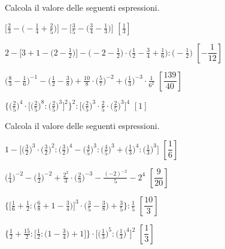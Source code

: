 \begin{esercizio}[\Ast]
\label{ese:3.148}
 Calcola il valore delle seguenti espressioni.
\begin{enumeratea}
\spazielenx
\item $\displaystyle{\bigg[\frac{2}{3}-\bigg(-\frac{1}{4}+\frac{2}{5}\bigg)
\bigg]-\bigg[\frac{3}{5}-%
\bigg(\frac{3}{4}-\frac{1}{3}\bigg)\bigg]}$
  \hfill \(\left[\frac{1}{3} \right]\)
\item $\displaystyle{2-\bigg[3+1-\bigg(2-\frac{1}{2}\bigg)\bigg]-
\bigg(-2-\frac{1}{2}\bigg)\cdot%
\bigg(\frac{1}{2}-\frac{3}{4}+\frac{1}{6}\bigg):\bigg(-{\frac{1}{2}}\bigg)}$
  \hfill \(\left[-\dfrac{1}{12} \right]\)
\item $\displaystyle{\bigg(\frac{8}{3}-\frac{1}{6}\bigg)^{-1}-
\bigg(\frac{1}{2}-\frac{3}{8}\bigg)+\frac{10}{8}\cdot%
\bigg(\frac{5}{7}\bigg)^{-2}+\bigg(\frac{1}{3}\bigg)^{-3}\cdot
\frac{1}{6^{2}}}$
  \hfill \(\left[\dfrac{139}{40} \right]\)
\item $\displaystyle{\bigg\{\bigg(\frac{2}{5}\bigg)^{4}\cdot
\bigg[\bigg(\frac{2}{5}\bigg)^{8}:%
\bigg(\frac{2}{5}\bigg)^{3}\bigg]^{2}\bigg\}^{2}:
\bigg[\bigg(\frac{2}{5}\bigg)^{3}\cdot{\frac{2}{5}}\cdot%
\bigg(\frac{2}{5}\bigg)^{3}\bigg]^{4}}$
  \hfill \(\left[1 \right]\)
\end{enumeratea}
\end{esercizio}

\begin{esercizio}[\Ast]
\label{ese:3.149}
Calcola il valore delle seguenti espressioni.
\begin{enumeratea}
\spazielenx
\item $\displaystyle{1-\bigg[\bigg(\frac{3}{2}\bigg)^{3}\cdot%
\bigg(\frac{3}{2}\bigg)^{2}:\bigg(\frac{3}{2}\bigg)^{4}-
\bigg(\frac{4}{5}\bigg)^{3}:\bigg(\frac{4}{5}\bigg)^{3}+%
\bigg(\frac{1}{3}\bigg)^{4}:\bigg(\frac{1}{3}\bigg)^{3}\bigg]}$
  \hfill \(\left[\dfrac{1}{6} \right]\)
\item $\displaystyle{\bigg(\frac{1}{4}\bigg)^{-2}-\bigg(\frac{1}{2}\bigg)^{-2}+
\frac{2^{2}}{3}\cdot%
\bigg(\frac{2}{3}\bigg)^{-3}-\frac{(-2)^{-2}}{5}-2^{4}}$
  \hfill \(\left[\dfrac{9}{20} \right]\)
\item $\displaystyle{\bigg\{\bigg[\frac{1}{6}+\frac{1}{2}:\bigg(\frac{6}{8}+1-
\frac{3}{4}\bigg)\bigg]^{3}\cdot%
\bigg(\frac{3}{5}-\frac{3}{8}\bigg)+\frac{3}{5}\bigg\}:\frac{1}{5}}$
  \hfill \(\left[\dfrac{10}{3} \right]\)
\item $\displaystyle{\bigg\{\frac{1}{2}+\frac{15}{2}:\bigg[\frac{1}{2}:
\bigg(1-\frac{3}{4}\bigg)+1\bigg]\bigg\}\cdot%
\bigg[\bigg(\frac{1}{3}\bigg)^{5}:\bigg(\frac{1}{3}\bigg)^{4}\bigg]^{2}}$
  \hfill \(\left[\dfrac{1}{3} \right]\)
\end{enumeratea}
\end{esercizio}


